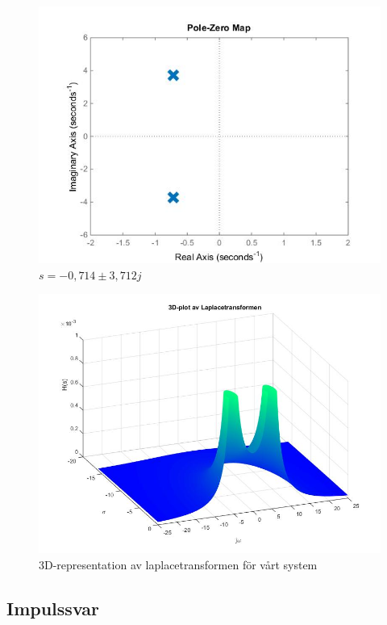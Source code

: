 \documentclass[10pt,a4paper]{article}
\begin{document}
\begin{figure}[h]
\begin{center}
\includegraphics[scale=0.4]{nolpol-diagram}
\caption{$s = -0,714 \pm 3,712j$}
\end{center}
\end{figure}
\begin{figure}[h]
\begin{center}
\includegraphics[scale=0.25]{3Dpoler5}
\caption{3D-representation av laplacetransformen för vårt system}
\end{center}
\end{figure}

\newpage


\subsection{Impulssvar}
\end{document}
